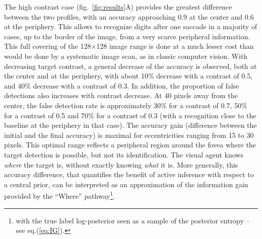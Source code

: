The high contrast case (fig.~\ref{fig:results}A) provides the greatest difference between the two profiles, with an accuracy approaching 0.9 at the center and 0.6 at the periphery. This allows to recognize digits after one saccade in a majority of cases, up to the border of the image, from a very scarce peripheral information. This full covering of the 128$\times$128 image range is done at a much lesser cost than would be done by a systematic image scan, as in classic computer vision. With decreasing target contrast, a general decrease of the accuracy is observed, both at the center and at the periphery, with about 10\% decrease with a contrast of 0.5, and 40\% decrease with a contrast of 0.3. In addition, the proportion of false detections also increases with contrast decrease. At 40 pixels away from the center, the false detection rate is approximately 30\% for a contrast of 0.7, 50\% for a contrast of 0.5 and 70\% for a contrast of 0.3 (with a recognition close to the baseline at the periphery in that case). The accuracy gain (difference between the initial and the final accuracy) is maximal for eccentricities ranging from 15 to 30 pixels. This optimal range reflects a peripheral region around the fovea where the target detection is possible, but not its identification. The visual agent knows \emph{where} the target is, without exactly knowing \emph{what} it is. 
More generally, this accuracy difference, that quantifies the benefit of active inference with respect to a central prior, can be interpreted as an approximation of the information gain provided by the ``Where'' pathway\footnote{with the true label log-posterior seen as a sample of the posterior entropy -- see eq.(\ref{eq:IG}).}.



